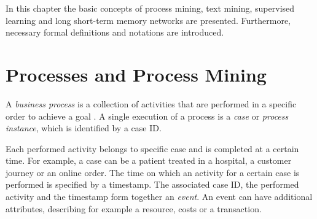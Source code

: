 In this chapter the basic concepts of process mining, text mining, supervised learning and long short-term memory networks are presented. Furthermore, necessary formal definitions and notations are introduced.

\section{Processes and Process Mining}

\begin{definition}
	A \textit{business process} is a collection of activities that are performed in a specific order to achieve a goal \cite{DBLP:conf/bpm/AalstAM11}.
	A single execution of a process is a \textit{case} or \textit{process instance}, which is identified by a case ID.
\end{definition}

Each performed activity belongs to specific case and is completed at a certain time.
For example, a case can be a patient treated in a hospital, a customer journey or an online order. The time on which an activity for a certain case is performed is specified by a timestamp.
The associated case ID, the performed activity and the timestamp form together an \textit{event}.
An event can have additional attributes, describing for example a resource, costs or a transaction.

